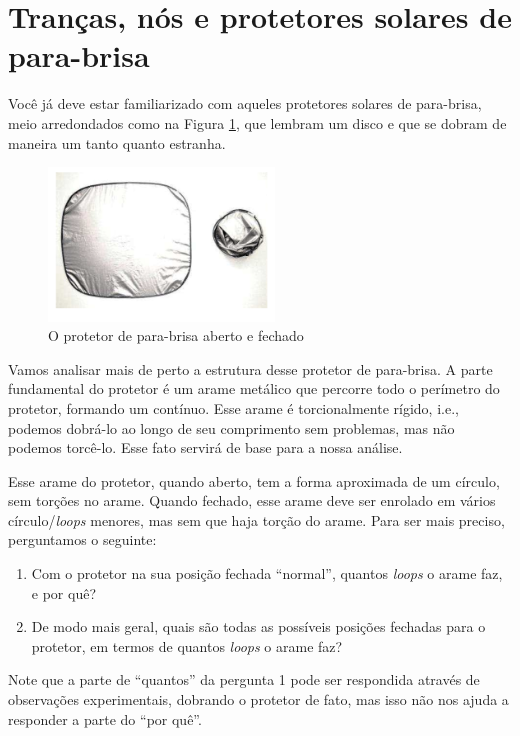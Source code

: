 \section{Tranças, nós e protetores solares de para-brisa}
    Você já deve estar familiarizado com aqueles protetores solares de para-brisa, meio arredondados como 
    na Figura \ref{protetor solar}, que lembram um disco e que se dobram de maneira um tanto quanto estranha.
	\begin{figure}[H]
		\begin{center}
			\includegraphics[width=6cm]{Images/protetor_solar.png}
		\end{center}\caption{O protetor de para-brisa aberto e fechado}\label{protetor solar}
	\end{figure}
	Vamos analisar mais de perto a estrutura desse protetor de para-brisa. 
	A parte fundamental do protetor é um arame metálico que percorre todo o perímetro do protetor, formando 
	um  contínuo. Esse arame é torcionalmente rígido, i.e., podemos dobrá-lo ao longo de seu 
	comprimento sem problemas, mas não podemos torcê-lo. Esse fato servirá de base para a nossa análise.
	
	\par\vspace{0.3cm} Esse arame do protetor, quando aberto, tem a forma aproximada de um círculo, sem 
	torções no arame. Quando fechado, esse arame deve ser enrolado em vários círculo/\textit{loops} menores, 
	mas sem que haja torção do arame. Para ser mais preciso, perguntamos o seguinte:
	\begin{enumerate}
		\item Com o protetor na sua posição fechada ``normal'', quantos \textit{loops} o arame faz, e por quê?
		\item De modo mais geral, quais são todas as possíveis posições fechadas para o protetor, em 
		termos de quantos \textit{loops} o arame faz? 
	\end{enumerate} 
	Note que a parte de ``quantos'' da pergunta 1 pode ser respondida através de observações
	experimentais, dobrando o protetor de fato, mas isso não nos ajuda a responder a parte do ``por quê''.
	
